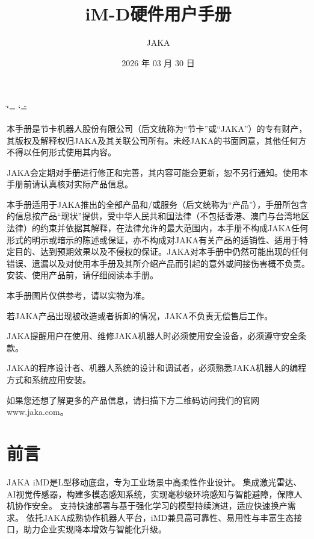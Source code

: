 \documentclass[a4paper,11pt,english,openany,oneside]{sphinxmanual}
\title{iM-D硬件用户手册}
\date{2026 年 03 月 30 日}
\author{JAKA}
\let\origsphinxtableofcontents\sphinxtableofcontents
\renewcommand{\sphinxtableofcontents}{
    \begingroup
    \cleardoublepage
    \pagenumbering{Roman}
    \pagestyle{plain} 
    \hypersetup{linkcolor=black}
    \origsphinxtableofcontents
    \clearpage
    \endgroup
    \pagenumbering{arabic}
    \pagestyle{normal}
}
\begin{document}
\ifdefined\shorthandoff
  \ifnum\catcode`\=\string=\active\shorthandoff{=}\fi
  \ifnum\catcode`\"=\active{}\fi
\fi

\pagestyle{empty}

\pagestyle{plain}
\sphinxtableofcontents
\pagestyle{normal}
\label{\detokenize{index::doc}}


\sphinxAtStartPar
本手册是节卡机器人股份有限公司（后文统称为“节卡”或“JAKA”）的专有财产，其版权及解释权归JAKA及其关联公司所有。未经JAKA的书面同意，其他任何方不得以任何形式使用其内容。

\sphinxAtStartPar
JAKA会定期对手册进行修正和完善，其内容可能会更新，恕不另行通知。使用本手册前请认真核对实际产品信息。

\sphinxAtStartPar
本手册适用于JAKA推出的全部产品和/或服务（后文统称为“产品”），手册所包含的信息按产品“现状”提供，受中华人民共和国法律（不包括香港、澳门与台湾地区法律）的约束并依据其解释，在法律允许的最大范围内，本手册不构成JAKA任何形式的明示或暗示的陈述或保证，亦不构成对JAKA有关产品的适销性、适用于特定目的、达到预期效果以及不侵权的保证。JAKA对本手册中仍然可能出现的任何错误、遗漏以及对使用本手册及其所介绍产品而引起的意外或间接伤害概不负责。安装、使用产品前，请仔细阅读本手册。

\sphinxAtStartPar
本手册图片仅供参考，请以实物为准。

\sphinxAtStartPar
若JAKA产品出现被改造或者拆卸的情况，JAKA不负责无偿售后工作。

\sphinxAtStartPar
JAKA提醒用户在使用、维修JAKA机器人时必须使用安全设备，必须遵守安全条款。

\sphinxAtStartPar
JAKA的程序设计者、机器人系统的设计和调试者，必须熟悉JAKA机器人的编程方式和系统应用安装。

\sphinxAtStartPar
{}

\sphinxAtStartPar
如果您还想了解更多的产品信息，请扫描下方二维码访问我们的官网www.jaka.com。

\begin{figure}[H]
\centering

\noindent{}
\end{figure}

\sphinxstepscope


\chapter{前言}
\label{\detokenize{02 _u524d_u8a00:id1}}\label{\detokenize{02 _u524d_u8a00::doc}}
\sphinxAtStartPar
JAKA iM\sphinxhyphen{}D是L型移动底盘，专为工业场景中高柔性作业设计。
集成激光雷达、AI视觉传感器，构建多模态感知系统，实现毫秒级环境感知与智能避障，保障人机协作安全。
支持快速部署与基于强化学习的模型持续演进，适应快速换产需求。
依托JAKA成熟协作机器人平台，iM\sphinxhyphen{}D兼具高可靠性、易用性与丰富生态接口，助力企业实现降本增效与智能化升级。
\end{document}
